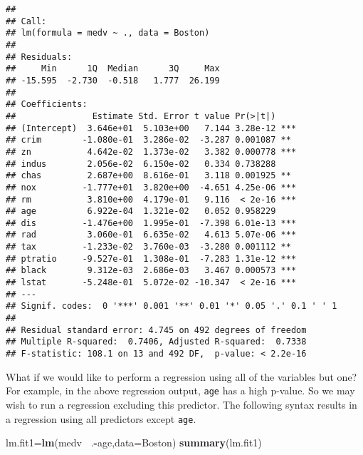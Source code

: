 \documentclass[]{article}
\newenvironment{Shaded}{\begin{snugshade}}{\end{snugshade}}
\newcommand{\KeywordTok}[1]{\textcolor[rgb]{0.13,0.29,0.53}{\textbf{#1}}}
\newcommand{\DataTypeTok}[1]{\textcolor[rgb]{0.13,0.29,0.53}{#1}}
\newcommand{\OperatorTok}[1]{\textcolor[rgb]{0.81,0.36,0.00}{\textbf{#1}}}
\newcommand{\NormalTok}[1]{#1}
\begin{document}
\begin{verbatim}
## 
## Call:
## lm(formula = medv ~ ., data = Boston)
## 
## Residuals:
##     Min      1Q  Median      3Q     Max 
## -15.595  -2.730  -0.518   1.777  26.199 
## 
## Coefficients:
##               Estimate Std. Error t value Pr(>|t|)    
## (Intercept)  3.646e+01  5.103e+00   7.144 3.28e-12 ***
## crim        -1.080e-01  3.286e-02  -3.287 0.001087 ** 
## zn           4.642e-02  1.373e-02   3.382 0.000778 ***
## indus        2.056e-02  6.150e-02   0.334 0.738288    
## chas         2.687e+00  8.616e-01   3.118 0.001925 ** 
## nox         -1.777e+01  3.820e+00  -4.651 4.25e-06 ***
## rm           3.810e+00  4.179e-01   9.116  < 2e-16 ***
## age          6.922e-04  1.321e-02   0.052 0.958229    
## dis         -1.476e+00  1.995e-01  -7.398 6.01e-13 ***
## rad          3.060e-01  6.635e-02   4.613 5.07e-06 ***
## tax         -1.233e-02  3.760e-03  -3.280 0.001112 ** 
## ptratio     -9.527e-01  1.308e-01  -7.283 1.31e-12 ***
## black        9.312e-03  2.686e-03   3.467 0.000573 ***
## lstat       -5.248e-01  5.072e-02 -10.347  < 2e-16 ***
## ---
## Signif. codes:  0 '***' 0.001 '**' 0.01 '*' 0.05 '.' 0.1 ' ' 1
## 
## Residual standard error: 4.745 on 492 degrees of freedom
## Multiple R-squared:  0.7406, Adjusted R-squared:  0.7338 
## F-statistic: 108.1 on 13 and 492 DF,  p-value: < 2.2e-16
\end{verbatim}

What if we would like to perform a regression using all of the variables
but one? For example, in the above regression output, \texttt{age} has a
high p-value. So we may wish to run a regression excluding this
predictor. The following syntax results in a regression using all
predictors except \texttt{age}.

\begin{Shaded}
\begin{Highlighting}[]
\NormalTok{lm.fit1=}\KeywordTok{lm}\NormalTok{(medv }\OperatorTok{~}\NormalTok{.}\OperatorTok{-}\NormalTok{age,}\DataTypeTok{data=}\NormalTok{Boston) }
\KeywordTok{summary}\NormalTok{(lm.fit1)}
\end{Highlighting}
\end{Shaded}
\end{document}

